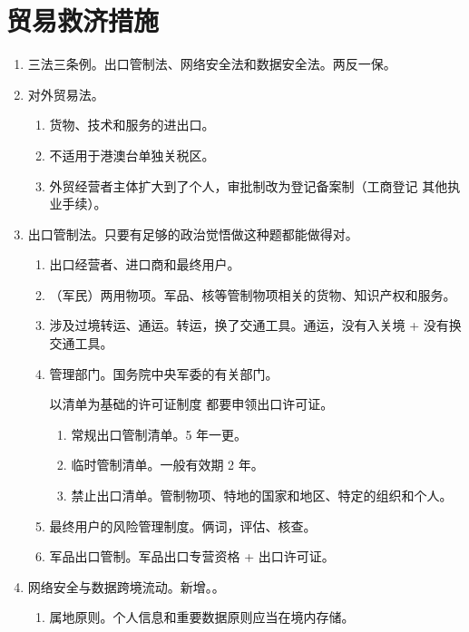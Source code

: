 \section{贸易救济措施}
\begin{enumerate}
  \item 三法三条例。出口管制法、网络安全法和数据安全法。两反一保。
  \item 对外贸易法。
        \begin{enumerate}
          \item 货物、技术和服务的进出口。
          \item 不适用于港澳台单独关税区。
          \item 外贸经营者主体扩大到了个人，审批制改为登记备案制（工商登记 \hz 其他执业手续）。
        \end{enumerate}
  \item 出口管制法。只要有足够的政治觉悟做这种题都能做得对。
        \begin{enumerate}
          \item 出口经营者、进口商和最终用户。
          \item （军民）两用物项。军品、核等管制物项相关的货物、知识产权和服务。
          \item 涉及过境转运、通运。转运，换了交通工具。通运，没有入关境 + 没有换交通工具。
          \item 管理部门。国务院中央军委的有关部门。
                \begin{kk}{以清单为基础的许可证制度}
                  都要申领出口许可证。
                  \begin{enumerate}
                    \item 常规出口管制清单。5 年一更。
                    \item 临时管制清单。一般有效期 2 年。
                    \item 禁止出口清单。管制物项、特地的国家和地区、特定的组织和个人。
                  \end{enumerate}
                \end{kk}
          \item 最终用户的风险管理制度。俩词，评估、核查。
          \item 军品出口管制。军品出口专营资格 + 出口许可证。
        \end{enumerate}
  \item 网络安全与数据跨境流动。新增。。
        \begin{enumerate}
          \item 属地原则。个人信息和重要数据原则应当在境内存储。

\end{enumerate}
\end{enumerate}
